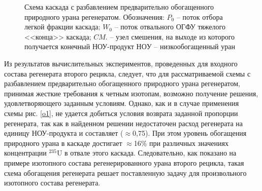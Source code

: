 \begin{figure}[ht]
  \caption{Схема каскада с разбавлением предварительно обогащенного природного урана регенератом. Обозначения: $P_0$ -- поток отбора легкой фракции каскада; $W_0$ -- поток отвального ОГФУ тяжелого <<конца>> каскада; $CM.$ -- узел смешения, на выходе из которого получается конечный НОУ-продукт $НОУ$  -- низкообогащенный уран}\label{o2}
\end{figure}

Из результатов вычислительных экспериментов, проведенных для входного состава регенерата второго рецикла, следует, что для рассматриваемой схемы с разбавлением предварительно обогащенного природного урана регенератом, принимая жесткие требования к четным изотопам, возможно получение решения, удовлетворяющего заданным условиям. Однако, как и в случае применения схемы рис. \ref{o1}, не удается добиться условия возврата заданной пропорции регенерата, так как в найденном решении недостаточен расход регенерата на единицу НОУ-продукта и составляет ($\approx$0,75). При этом уровень обогащения природного урана в каскаде достигает $\approx$16\% при различных значениях концентрации $^{235}$U в отвале этого каскада. Следовательно, как показано на примере изотопного состава регенерированного урана второго рецикла, такая схема обогащения регенерата решает поставленную задачу для произвольного изотопного состава регенерата.


